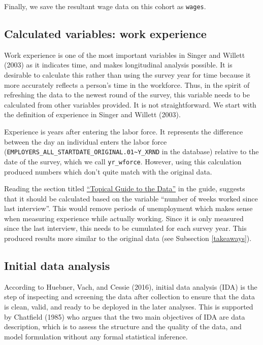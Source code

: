 \documentclass{article}
\begin{document}
Finally, we save the resultant wage data on this cohort as \texttt{wages}.

\hypertarget{calculated-variables-work-experience}{%
\subsection{Calculated variables: work experience}\label{calculated-variables-work-experience}}

Work experience is one of the most important variables in Singer and Willett (2003) as it indicates time, and makes longitudinal analysis possible. It is desirable to calculate this rather than using the survey year for time because it more accurately reflects a person's time in the workforce. Thus, in the spirit of refreshing the data to the newest round of the survey, this variable needs to be calculated from other variables provided. It is not straightforward. We start with the definition of experience in Singer and Willett (2003).

Experience is years after entering the labor force. It represents the difference between the day an individual enters the labor force (\texttt{EMPLOYERS\_ALL\_STARTDATE\_ORIGINAL.01\textasciitilde{}Y\_XRND} in the database) relative to the date of the survey, which we call \texttt{yr\_wforce}. However, using this calculation produced numbers which don't quite match with the original data.

Reading the section titled \href{https://www.nlsinfo.org/content/cohorts/nlsy79/topical-guide/employment/work-experience}{``Topical Guide to the Data''} in the guide, suggests that it should be calculated based on the variable ``number of weeks worked since last interview''. This would remove periods of unemployment which makes sense when measuring experience while actually working. Since it is only measured since the last interview, this needs to be cumulated for each survey year. This produced results more similar to the original data (see Subsection \ref{takeaways}).

\hypertarget{ida}{%
\subsection{Initial data analysis}\label{ida}}

According to Huebner, Vach, and Cessie (2016), initial data analysis (IDA) is the step of inspecting and screening the data after collection to ensure that the data is clean, valid, and ready to be deployed in the later analyses. This is supported by Chatfield (1985) who argues that the two main objectives of IDA are data description, which is to assess the structure and the quality of the data, and model formulation without any formal statistical inference.
\end{document}
